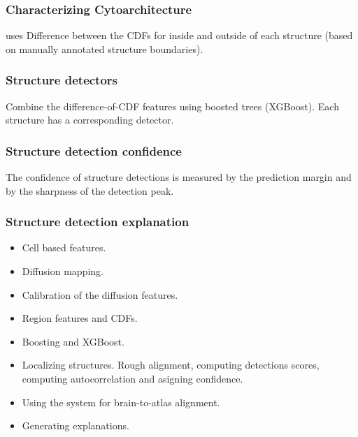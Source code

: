 \documentclass[runningheads]{llncs}
\begin{document}
      \subsubsection{ Characterizing Cytoarchitecture} uses Difference between the CDFs for inside and outside of each structure (based on manually annotated structure boundaries). 
\subsubsection { Structure detectors} Combine the difference-of-CDF
features using boosted trees (XGBoost). Each structure has a
corresponding detector.

\subsubsection { Structure detection confidence} The confidence of structure
  detections is measured by the prediction margin and by the sharpness
  of the detection peak.

\subsubsection { Structure detection explanation}

\begin{itemize}
\item Cell based features.
\item Diffusion mapping.
\item Calibration of the diffusion features.
\item Region features and CDFs.
\item Boosting and XGBoost.
\item Localizing structures. Rough alignment, computing detections
  scores, computing autocorrelation and asigning confidence.
\item Using the system for brain-to-atlas alignment.
\item Generating explanations.
\end{itemize}
\end{document}

